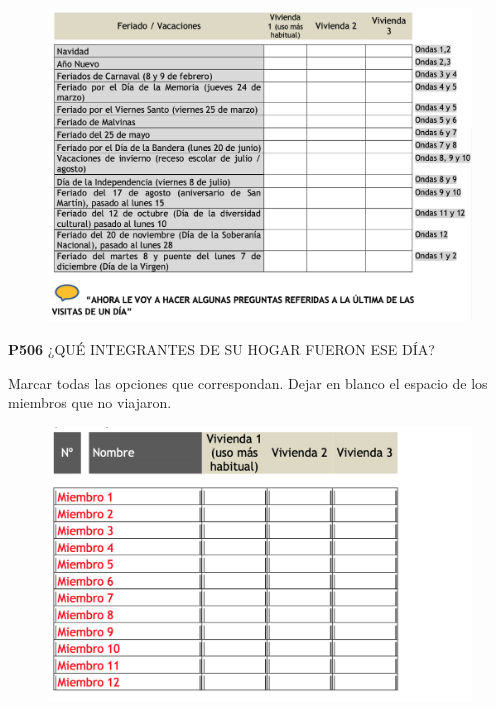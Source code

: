\documentclass[
  openany]{book}
\begin{document}
\begin{figure}

{\centering \includegraphics[width=1\linewidth]{imagenes/figura6-194} 

}

\end{figure}

\textbf{P506} ¿QUÉ INTEGRANTES DE SU HOGAR FUERON ESE DÍA?

Marcar todas las opciones que correspondan. Dejar en blanco el espacio de los miembros que no viajaron.

\begin{figure}

{\centering \includegraphics[width=1\linewidth]{imagenes/figura6-195} 

}

\end{figure}
\end{document}
